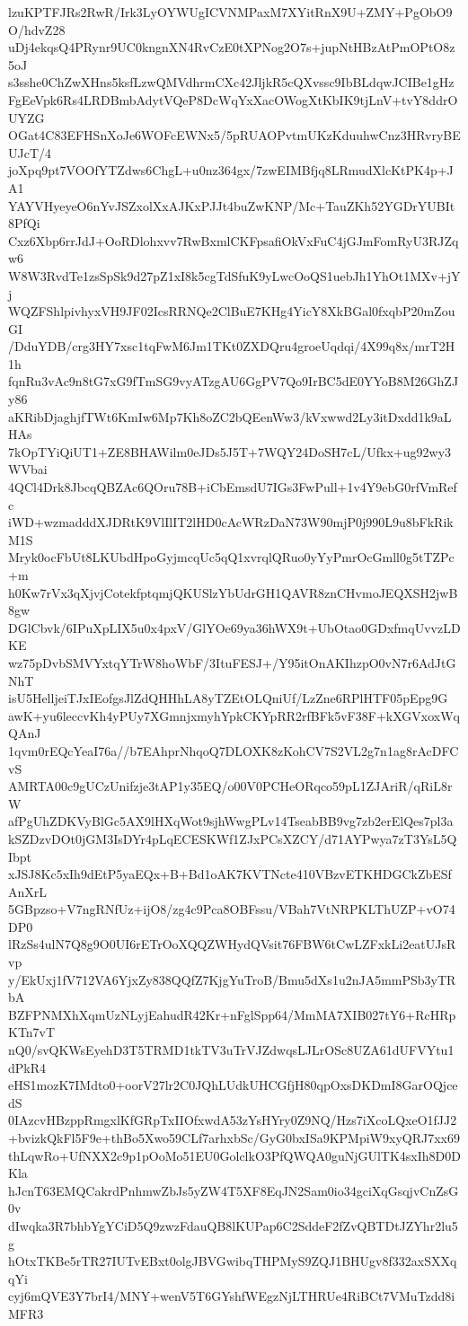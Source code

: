 lzuKPTFJRs2RwR/Irk3LyOYWUgICVNMPaxM7XYitRnX9U+ZMY+PgObO9O/hdvZ28
uDj4ekqsQ4PRynr9UC0kngnXN4RvCzE0tXPNog2O7s+jupNtHBzAtPmOPtO8z5oJ
s3sshe0ChZwXHns5ksfLzwQMVdhrmCXc42JljkR5cQXvssc9IbBLdqwJCIBe1gHz
FgEeVpk6Rs4LRDBmbAdytVQeP8DcWqYxXacOWogXtKbIK9tjLnV+tvY8ddrOUYZG
OGat4C83EFHSnXoJe6WOFcEWNx5/5pRUAOPvtmUKzKduuhwCnz3HRvryBEUJcT/4
joXpq9pt7VOOfYTZdws6ChgL+u0nz364gx/7zwEIMBfjq8LRmudXlcKtPK4p+JA1
YAYVHyeyeO6nYvJSZxolXxAJKxPJJt4buZwKNP/Mc+TauZKh52YGDrYUBIt8PfQi
Cxz6Xbp6rrJdJ+OoRDlohxvv7RwBxmlCKFpsafiOkVxFuC4jGJmFomRyU3RJZqw6
W8W3RvdTe1zsSpSk9d27pZ1xI8k5cgTdSfuK9yLwcOoQS1uebJh1YhOt1MXv+jYj
WQZFShlpivhyxVH9JF02IcsRRNQe2ClBuE7KHg4YicY8XkBGal0fxqbP20mZouGI
/DduYDB/crg3HY7xsc1tqFwM6Jm1TKt0ZXDQru4groeUqdqi/4X99q8x/mrT2H1h
fqnRu3vAc9n8tG7xG9fTmSG9vyATzgAU6GgPV7Qo9IrBC5dE0YYoB8M26GhZJy86
aKRibDjaghjfTWt6KmIw6Mp7Kh8oZC2bQEenWw3/kVxwwd2Ly3itDxdd1k9aLHAs
7kOpTYiQiUT1+ZE8BHAWilm0eJDs5J5T+7WQY24DoSH7cL/Ufkx+ug92wy3WVbai
4QCl4Drk8JbcqQBZAc6QOru78B+iCbEmsdU7IGs3FwPull+1v4Y9ebG0rfVmRefc
iWD+wzmadddXJDRtK9VlIlIT2lHD0cAcWRzDaN73W90mjP0j990L9u8bFkRikM1S
Mryk0ocFbUt8LKUbdHpoGyjmcqUc5qQ1xvrqlQRuo0yYyPmrOcGmll0g5tTZPc+m
h0Kw7rVx3qXjvjCotekfptqmjQKUSlzYbUdrGH1QAVR8znCHvmoJEQXSH2jwB8gw
DGlCbvk/6IPuXpLIX5u0x4pxV/GlYOe69ya36hWX9t+UbOtao0GDxfmqUvvzLDKE
wz75pDvbSMVYxtqYTrW8hoWbF/3ItuFESJ+/Y95itOnAKIhzpO0vN7r6AdJtGNhT
isU5HelljeiTJxIEofgsJlZdQHHhLA8yTZEtOLQniUf/LzZne6RPlHTF05pEpg9G
awK+yu6leccvKh4yPUy7XGmnjxmyhYpkCKYpRR2rfBFk5vF38F+kXGVxoxWqQAnJ
1qvm0rEQcYeaI76a//b7EAhprNhqoQ7DLOXK8zKohCV7S2VL2g7n1ag8rAcDFCvS
AMRTA00c9gUCzUnifzje3tAP1y35EQ/o00V0PCHeORqco59pL1ZJAriR/qRiL8rW
afPgUhZDKVyBlGc5AX9lHXqWot9sjhWwgPLv14TseabBB9vg7zb2erElQes7pl3a
kSZDzvDOt0jGM3IsDYr4pLqECESKWf1ZJxPCsXZCY/d71AYPwya7zT3YsL5QIbpt
xJSJ8Kc5xIh9dEtP5yaEQx+B+Bd1oAK7KVTNcte410VBzvETKHDGCkZbESfAnXrL
5GBpzso+V7ngRNfUz+ijO8/zg4c9Pca8OBFssu/VBah7VtNRPKLThUZP+vO74DP0
lRzSs4ulN7Q8g9O0UI6rETrOoXQQZWHydQVsit76FBW6tCwLZFxkLi2eatUJsRvp
y/EkUxj1fV712VA6YjxZy838QQfZ7KjgYuTroB/Bmu5dXs1u2nJA5mmPSb3yTRbA
BZFPNMXhXqmUzNLyjEahudR42Kr+nFglSpp64/MmMA7XIB027tY6+RcHRpKTn7vT
nQ0/svQKWsEyehD3T5TRMD1tkTV3uTrVJZdwqsLJLrOSc8UZA61dUFVYtu1dPkR4
eHS1mozK7IMdto0+oorV27lr2C0JQhLUdkUHCGfjH80qpOxsDKDmI8GarOQjcedS
0IAzcvHBzppRmgxlKfGRpTxIIOfxwdA53zYsHYry0Z9NQ/Hzs7iXcoLQxeO1fJJ2
+bvizkQkFl5F9e+thBo5Xwo59CLf7arhxbSc/GyG0bxISa9KPMpiW9xyQRJ7xx69
thLqwRo+UfNXX2c9p1pOoMo51EU0GolclkO3PfQWQA0guNjGUlTK4sxIh8D0DKla
hJcnT63EMQCakrdPnhmwZbJs5yZW4T5XF8EqJN2Sam0io34gciXqGsqjvCnZsG0v
dIwqka3R7bhbYgYCiD5Q9zwzFdauQB8lKUPap6C2SddeF2fZvQBTDtJZYhr2lu5g
hOtxTKBe5rTR27IUTvEBxt0olgJBVGwibqTHPMyS9ZQJ1BHUgv8f332axSXXqqYi
cyj6mQVE3Y7brI4/MNY+wenV5T6GYshfWEgzNjLTHRUe4RiBCt7VMuTzdd8iMFR3
